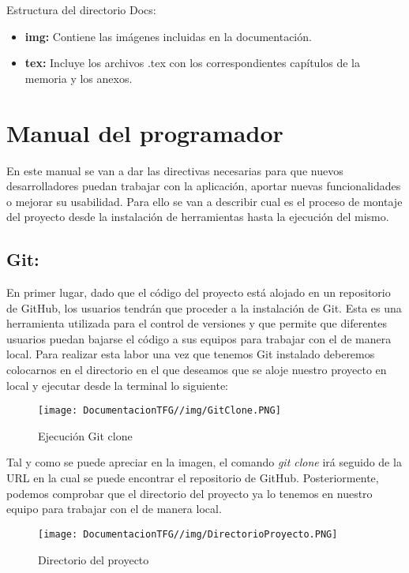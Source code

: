Estructura del directorio Docs:
\begin{itemize}
    \item \textbf{img: } Contiene las imágenes incluidas en la documentación.
    \item \textbf{tex: } Incluye los archivos .tex con los correspondientes capítulos de la memoria y los anexos.
\end{itemize}
    
\section{Manual del programador}
En este manual se van a dar las directivas necesarias para que nuevos desarrolladores puedan trabajar con la aplicación, aportar nuevas funcionalidades o mejorar su usabilidad. Para ello se van a describir cual es el proceso de montaje del proyecto desde la instalación de herramientas hasta la ejecución del mismo.

\subsection{Git:} En primer lugar, dado que el código del proyecto está alojado en un repositorio de GitHub, los usuarios tendrán que proceder a la instalación de Git. Esta es una herramienta utilizada para el control de versiones y que permite que diferentes usuarios puedan bajarse el código a sus equipos para trabajar con el de manera local. Para realizar esta labor una vez que tenemos Git instalado deberemos colocarnos en el directorio en el que deseamos que se aloje nuestro proyecto en local y ejecutar desde la terminal lo siguiente:
\begin{figure}[H]
    \centering
    \texttt{[image: DocumentacionTFG//img/GitClone.PNG]}
    \caption{Ejecución Git clone}
\end{figure}

Tal y como se puede apreciar en la imagen, el comando \textit{git clone} irá seguido de la URL en la cual se puede encontrar el repositorio de GitHub. Posteriormente, podemos comprobar que el directorio del proyecto ya lo tenemos en nuestro equipo para trabajar con el de manera local.

\begin{figure}[H]
    \centering
    \texttt{[image: DocumentacionTFG//img/DirectorioProyecto.PNG]}
    \caption{Directorio del proyecto}
\end{figure}

